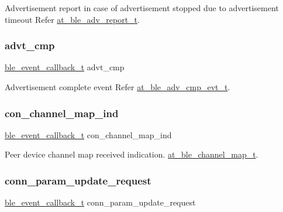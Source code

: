Advertisement report in case of advertisement stopped due to advertisement timeout Refer \mbox{\hyperlink{structat__ble__adv__report__t}{at\+\_\+ble\+\_\+adv\+\_\+report\+\_\+t}}. 

\mbox{\label{structble__gap__event__cb_abe12b31fb97d5e0c3d9d5586cd6f4644}} 
\subsubsection{\texorpdfstring{advt\_cmp}{advt\_cmp}}
{\footnotesize\ttfamily \mbox{\hyperlink{ble__manager_8h_a04ce4bb8cb8282f2762e3924b1773cc9}{ble\+\_\+event\+\_\+callback\+\_\+t}} advt\+\_\+cmp}



Advertisement complete event Refer \mbox{\hyperlink{structat__ble__adv__cmp__evt__t}{at\+\_\+ble\+\_\+adv\+\_\+cmp\+\_\+evt\+\_\+t}}. 

\mbox{\label{structble__gap__event__cb_a6b045c39cf5058dc43f1f65e4626b754}} 
\subsubsection{\texorpdfstring{con\_channel\_map\_ind}{con\_channel\_map\_ind}}
{\footnotesize\ttfamily \mbox{\hyperlink{ble__manager_8h_a04ce4bb8cb8282f2762e3924b1773cc9}{ble\+\_\+event\+\_\+callback\+\_\+t}} con\+\_\+channel\+\_\+map\+\_\+ind}



Peer device channel map received indication. \mbox{\hyperlink{structat__ble__channel__map__t}{at\+\_\+ble\+\_\+channel\+\_\+map\+\_\+t}}. 

\mbox{\label{structble__gap__event__cb_ab6bf3bb7fc558c70dba3e1f8b8905b8f}} 
\subsubsection{\texorpdfstring{conn\_param\_update\_request}{conn\_param\_update\_request}}
{\footnotesize\ttfamily \mbox{\hyperlink{ble__manager_8h_a04ce4bb8cb8282f2762e3924b1773cc9}{ble\+\_\+event\+\_\+callback\+\_\+t}} conn\+\_\+param\+\_\+update\+\_\+request}



